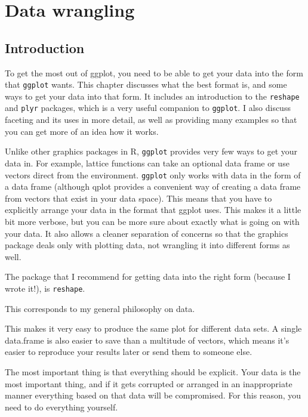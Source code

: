 
\label{cha:data}

\chapter{Data wrangling}

\section{Introduction}\label{sec:introduction}

To get the most out of ggplot, you need to be able to get your data into the form that {\tt ggplot} wants.  This chapter discusses what the best format is, and some ways to get your data into that form.  It includes an introduction to the {\tt reshape} and {\tt plyr} packages, which is a very useful companion to {\tt ggplot}.  I also discuss faceting and its uses in more detail, as well as providing many examples so that you can get more of an idea how it works.

Unlike other graphics packages in R, {\tt ggplot} provides very few ways to get your data in.  For example, lattice functions can take an optional data frame or use vectors direct from the environment.  {\tt ggplot} only works with data in the form of a data frame (although qplot provides a convenient way of creating a data frame from vectors that exist in your data space).  This means that you have to explicitly arrange your data in the format that ggplot uses.  This makes it a little bit more verbose, but you can be more sure about exactly what is going on with your data.  It also allows a cleaner separation of concerns so that the graphics package deals only with plotting data, not wrangling it into different forms as well.

The package that I recommend for getting data into the right form (because I wrote it!), is {\tt reshape}.

This corresponds to my general philosophy on data.  

This makes it very easy to produce the same plot for different data sets.  A single data.frame is also easier to save than a multitude of vectors, which means it's easier to reproduce your results later or send them to someone else.  

The most important thing is that everything should be explicit.  Your data is the most important thing, and if it gets corrupted or arranged in an inappropriate manner everything based on that data will be compromised.  For this reason, you need to do everything yourself.

